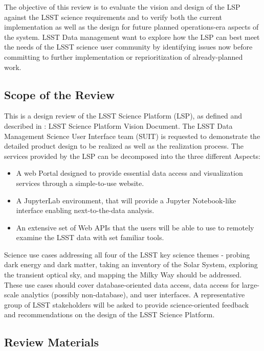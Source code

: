\documentclass[DM,lsstdraft,STS,toc]{lsstdoc}
\begin{document}
The objective of this review is to evaluate the vision and design of the LSP against the LSST science requirements and to verify both the current implementation 
as well as the design for future planned operations-era aspects of the system.  LSST Data management want to explore how the LSP can best meet the needs of the LSST science user community by 
identifying issues now before committing to further implementation or reprioritization of already-planned work.


\subsection{Scope of the Review}
\label{sec:scope}
This is a design review of the LSST Science Platform (LSP), as defined and described in : LSST Science Platform Vision Document. 
The LSST Data Management Science User Interface team (SUIT) is requested to demonstrate the detailed product design to be realized as well as the realization process. 
The services provided by the LSP can be decomposed into the three different Aspects:
\begin{itemize}
\item A web Portal designed to provide essential data access and visualization services through a simple-to-use website.
\item A JupyterLab environment, that will provide a Jupyter Notebook-like interface enabling next-to-the-data analysis.
\item An extensive set of Web APIs that the users will be able to use to remotely examine the LSST data with set familiar tools. 
\end{itemize}

Science use cases addressing all four of the LSST key science themes - probing dark energy and dark matter, 
taking an inventory of the Solar System, exploring the transient optical sky, and mapping the Milky Way should be addressed. 
These use cases should cover database-oriented data access, data access for large-scale analytics (possibly non-database), and user interfaces.
A representative group of LSST stakeholders will be asked to provide science-oriented feedback and recommendations on the design of the LSST Science Platform. 

\subsection{Review Materials}
\label{sec:materials}
\end{document}
